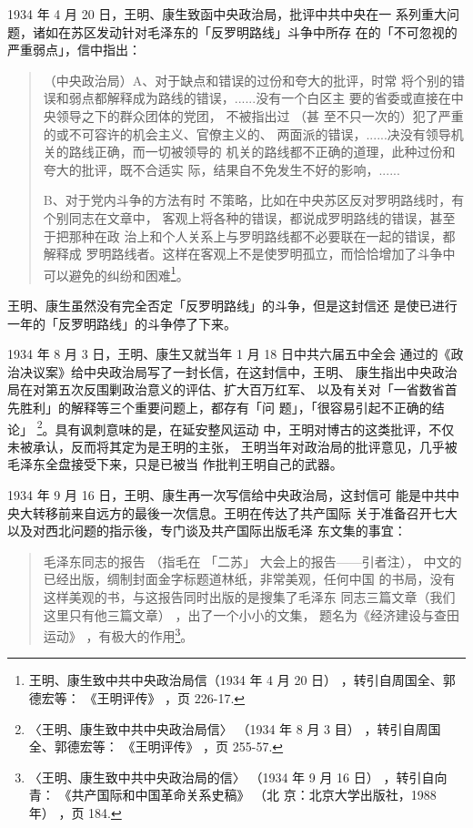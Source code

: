 1934 年 4 月 20 日，王明、康生致函中央政治局，批评中共中央在一
系列重大问题，诸如在苏区发动针对毛泽东的「反罗明路线」斗争中所存
在的「不可忽视的严重弱点」，信中指出：
\begin{quote}
	\fzwkai （中央政治局）A、对于缺点和错误的过份和夸大的批评，时常
将个别的错误和弱点都解释成为路线的错误，......没有一个白区主
要的省委或直接在中央领导之下的群众团体的党团，
不被指出过
（甚
至不只一次的）犯了严重的或不可容许的机会主义、官僚主义的、
两面派的错误，......决没有领导机关的路线正确，而一切被领导的
机关的路线都不正确的道理，此种过份和夸大的批评，既不合适实
际，结果自不免发生不好的影响，......

B、对于党内斗争的方法有时
不策略，比如在中央苏区反对罗明路线时，有个别同志在文章中，
客观上将各种的错误，都说成罗明路线的错误，甚至于把那种在政
治上和个人关系上与罗明路线都不必要联在一起的错误，都解释成
罗明路线者。这样在客观上不是使罗明孤立，而恰恰增加了斗争中
可以避免的纠纷和困难\footnote{王明、康生致中共中央政治局信（1934 年 4 月 20 日）
，转引自周国全、郭德宏等：
《王明评传》
，页 226-17.}。
\end{quote}

王明、康生虽然没有完全否定「反罗明路线」的斗争，但是这封信还
是使已进行一年的「反罗明路线」的斗争停了下来。

1934 年 8 月 3 日，王明、康生又就当年 1 月 18 日中共六届五中全会
通过的《政治决议案》给中央政治局写了一封长信，在这封信中，王明、
康生指出中央政治局在对第五次反围剿政治意义的评估、扩大百万红军、
以及有关对「一省数省首先胜利」的解释等三个重要问题上，都存有「问
题」，「很容易引起不正确的结论」 \footnote{〈王明、康生致中共中央政治局信〉
（1934 年 8 月 3 目）
，转引自周国全、郭德宏等：
《王明评传》
，页 255-57.}。具有讽刺意味的是，在延安整风运动 
中，王明对博古的这类批评，不仅未被承认，反而将其定为是王明的主张，
王明当年对政治局的批评意见，几乎被毛泽东全盘接受下来，只是已被当
作批判王明自己的武器。

1934 年 9 月 16 日，王明、康生再一次写信给中央政治局，这封信可
能是中共中央大转移前来自远方的最後一次信息。王明在传达了共产国际
关于准备召开七大以及对西北问题的指示後，专门谈及共产国际出版毛泽
东文集的事宜：
\begin{quote}
	\fzwkai 毛泽东同志的报告
（指毛在
「二苏」
大会上的报告——引者注），
中文的已经出版，绸制封面金字标题道林纸，非常美观，任何中国
的书局，没有这样美观的书，与这报告同时出版的是搜集了毛泽东
同志三篇文章（我们这里只有他三篇文章） ，出了一个小小的文集，
题名为《经济建设与查田运动》 ，有极大的作用\footnote{〈王明、康生致中共中央政治局的信〉
（1934 年 9 月 16 日）
，转引自向青：
《共产国际和中国革命关系史稿》
（北
京：北京大学出版社，1988 年）
，页 184.}。
\end{quote}

